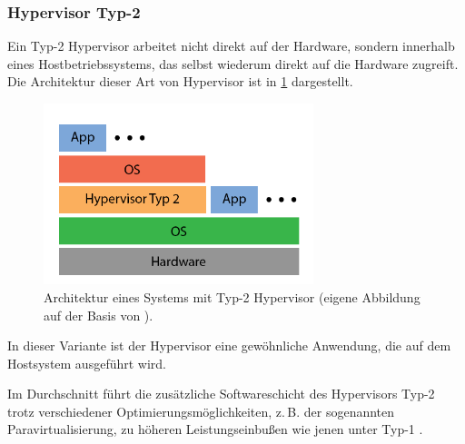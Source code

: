 \documentclass[../main.tex]{subfiles}
\begin{document}

			\subsubsection{Hypervisor Typ-2}
				Ein Typ-2 Hypervisor arbeitet nicht direkt auf der Hardware, sondern innerhalb eines Hostbetriebssystems, das selbst wiederum direkt auf die Hardware zugreift. Die Architektur dieser Art von Hypervisor ist in \fig \ref{fig:intro_hypervisor2} dargestellt.

				\begin{figure}[h]
	          \centering
	          \includegraphics[width=0.7\textwidth]{./images/intro_hypervisor2.png}
	          \caption{Architektur eines Systems mit Typ-2 Hypervisor (eigene Abbildung auf der Basis von \cite[S.107]{tanenbaumOS}).}
	          \label{fig:intro_hypervisor2}
	      \end{figure}

				In dieser Variante ist der Hypervisor eine gewöhnliche Anwendung, die auf dem Hostsystem ausgeführt wird.


				Im Durchschnitt führt die zusätzliche Softwareschicht des Hypervisors Typ-2 trotz verschiedener Optimierungsmöglichkeiten, z.\,B. der sogenannten Paravirtualisierung, zu höheren Leistungseinbußen wie jenen unter Typ-1 \cite[S.666f.]{tanenbaumOS}.
\end{document}
